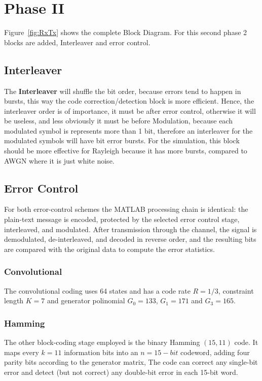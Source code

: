 \section{Phase II}
\label{sec:phase2}

Figure~\ref{fig:RxTx} shows the complete Block Diagram. For this second phase 2 blocks are added, Interleaver and error control. 

\subsection{Interleaver}

The \textbf{Interleaver} will shuffle the bit order, because errors tend to happen in bursts, this way the code correction/detection block is more efficient. Hence, the interleaver order is of importance, it must be after error control, otherwise it will be useless, and less obviously it must be before Modulation, because each modulated symbol is represents more than 1 bit, therefore an interleaver for the modulated symbols will have bit error bursts. For the simulation, this block should be more effective for Rayleigh because it has more bursts, compared to AWGN where it is just white noise. 

\subsection{Error Control}

For both error-control schemes the MATLAB processing chain is identical: the plain-text message is encoded, protected by the selected error control stage, interleaved, and modulated. After transmission through the channel, the signal is demodulated, de-interleaved, and decoded in reverse order, and the resulting bits are compared with the original data to compute the error statistics.

\subsubsection{Convolutional}

The convolutional coding uses 64 states and has a code rate $R = 1/3$, constraint length $K = 7$ and generator polinomial $G_0 = 133$, $G_1=171$ and $G_3 = 165$. 

\subsubsection{Hamming}

The other block-coding stage employed is the binary Hamming $(15,11)$ code. It maps every $k=11$ information bits into an $n=15-bit$ codeword, adding four parity bits according to the generator matrix, The code can correct any single-bit error and detect (but not correct) any double-bit error in each 15-bit word.

